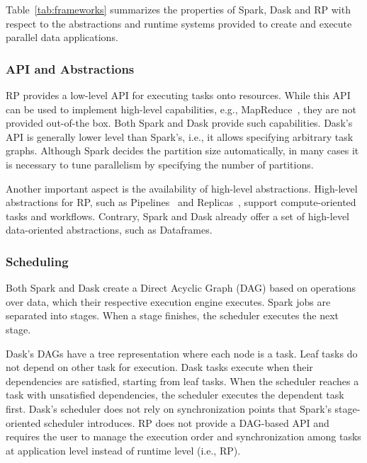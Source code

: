 Table~\ref{tab:frameworks} summarizes the properties of Spark, Dask and
RP with respect to the abstractions and runtime systems provided to
create and execute parallel data applications.

\subsubsection*{API and Abstractions}

RP provides a low-level API for executing tasks onto resources. While
this API can be used to implement high-level capabilities, e.g.,
MapReduce~\cite{mantha2012pilot}, they are not provided out-of-the box. Both
Spark and Dask provide such capabilities. Dask's API is generally lower level
than Spark's, i.e., it allows specifying arbitrary task graphs. Although Spark
decides the partition size automatically, in many cases it is necessary to tune
parallelism by specifying the number of partitions.

Another important aspect is the availability of high-level abstractions.
High-level abstractions for RP, such as 
Pipelines~\cite{balasubramanian2018harnessing} and 
Replicas~\cite{dakka2018concurrent}, support compute-oriented 
tasks and workflows. Contrary, Spark and Dask already offer a set of
high-level data-oriented abstractions, such as Dataframes. 


\subsubsection*{Scheduling}

Both Spark and Dask create a Direct Acyclic Graph (DAG) based on operations over
data, which their respective execution engine executes. Spark jobs are
separated into stages. When a stage finishes, the scheduler executes the
next stage.

Dask's DAGs have a tree representation where each node is a task. Leaf tasks do
not depend on other task for execution. Dask tasks execute when their
dependencies are satisfied, starting from leaf tasks. When the scheduler reaches a task
with unsatisfied dependencies, the scheduler executes the dependent task first.
Dask's scheduler does not rely on synchronization points that Spark's
stage-oriented scheduler introduces. RP does not provide a DAG-based
API and requires the user to manage the execution order and synchronization
among tasks at application level instead of runtime level (i.e., RP).

